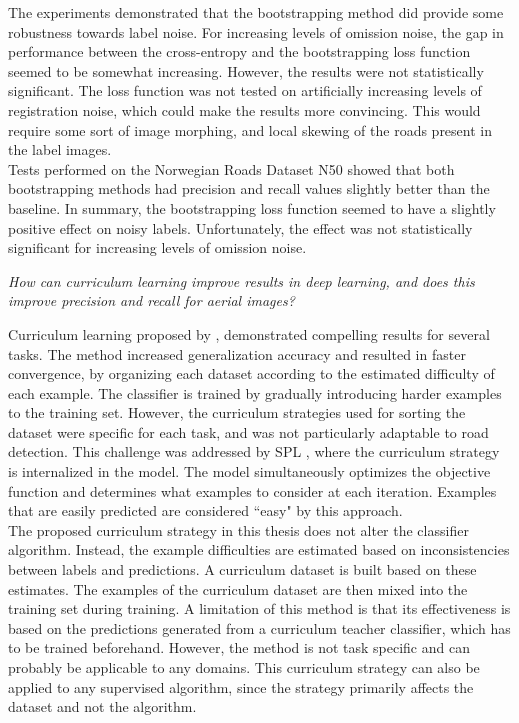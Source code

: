The experiments demonstrated that the bootstrapping method did provide some robustness towards label noise. For increasing levels of omission noise, the gap in performance between the cross-entropy and the bootstrapping loss function seemed to be somewhat increasing. However, the results were not statistically significant. The loss function was not tested on artificially increasing levels of registration noise, which could make the results more convincing. This would require some sort of image morphing, and local skewing of the roads present in the label images. \\

Tests performed on the Norwegian Roads Dataset N50 showed that both bootstrapping methods had precision and recall values slightly better than the baseline. In summary, the bootstrapping loss function seemed to have a slightly positive effect on noisy labels. Unfortunately, the effect was not statistically significant for increasing levels of omission noise. 

\begin{description}[ style=nextline, leftmargin=1.5em, rightmargin=1.5em]
\item[Research question 2:]{\it How can curriculum learning improve results in deep learning, and does this improve precision and recall for aerial images?}
\end{description}

Curriculum learning proposed by \cite{Bengio_curriculumlearning}, demonstrated compelling results for several tasks. The method increased generalization accuracy and resulted in faster convergence, by organizing each dataset according to the estimated difficulty of each example. The classifier is trained by gradually introducing harder examples to the training set. However, the curriculum strategies used for sorting the dataset were specific for each task, and was not particularly adaptable to road detection. This challenge was addressed by \ac{SPL} \citep{Kumar_self_paced_learning}, where the curriculum strategy is internalized in the model. The model simultaneously optimizes the objective function and determines what examples to consider at each iteration. Examples that are easily predicted are considered ``easy" by this approach.\\

The proposed curriculum strategy in this thesis does not alter the classifier algorithm. Instead, the example difficulties are estimated based on inconsistencies between labels and predictions. A curriculum dataset is built based on these estimates. The examples of the curriculum dataset are then mixed into the training set during training. A limitation of this method is that its effectiveness is based on the predictions generated from a curriculum teacher classifier, which has to be trained beforehand. However, the method is not task specific and can probably be applicable to any domains. This curriculum strategy can also be applied to any supervised algorithm, since the strategy primarily affects the dataset and not the algorithm. \\

